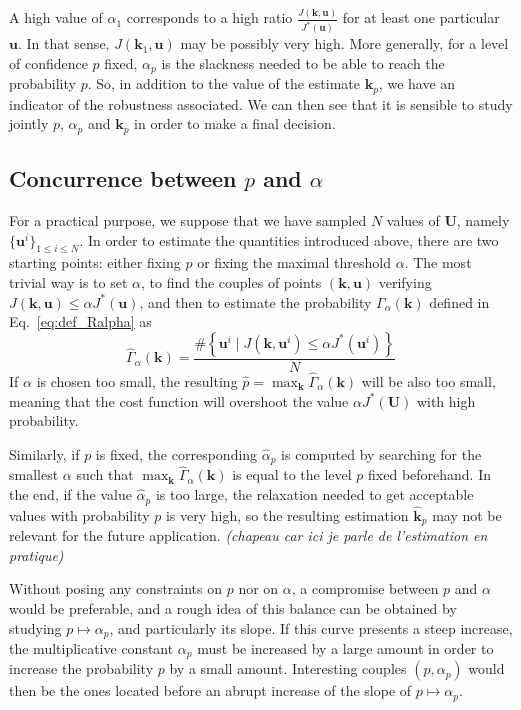 \documentclass[preprint, 1p]{elsarticle}
\newcommand{\checkap}{{\alpha}_p}
\newcommand{\checka}{{\alpha}}
\newcommand{\checkk}{\mathbf{k}}
\newcommand{\checkkp}{{\mathbf{k}}_p}
\newcommand{\victor}[1]{{\itshape\color{green} ({#1})}}
\begin{document}
A high value of $\checka_1$ corresponds to a high ratio $\frac{J(\mathbf{k},\mathbf{u})}{J^*(\mathbf{u})}$ for at least one particular $\mathbf{u}$. In that sense, $J(\checkk_1,\mathbf{u})$ may be possibly very high.
More generally, for a level of confidence $p$ fixed, $\checkap$ is the slackness needed to be able to reach the probability $p$. So, in addition to the value of the estimate $\checkkp$, we have an indicator of the robustness associated. We can then see that it is sensible to study jointly $p$, $\checkap$ and $\checkkp$ in order to make a final decision.


\subsection{Concurrence between $p$ and $\alpha$}%
\label{ssec:balance}
For a practical purpose, we suppose that we have sampled $N$ values of $\mathbf{U}$, namely $\{\mathbf{u}^i\}_{1\leq i \leq N}$.
In order to estimate the quantities introduced above, there are two starting points: either fixing $p$ or fixing the maximal threshold $\alpha$. 
The most trivial way is to set $\alpha$, to find the couples of points $(\mathbf{k},\mathbf{u})$ verifying $J(\mathbf{k},\mathbf{u}) \leq \alpha J^*(\mathbf{u})$, and then to estimate the probability $\Gamma_{\alpha}(\mathbf{k})$ defined in Eq.~\eqref{eq:def_Ralpha} as 
\begin{equation}
\hat{\Gamma}_{\alpha}(\mathbf{k}) = \frac{\# \left\{\mathbf{u}^i \mid J(\mathbf{k},\mathbf{u}^i) \leq \alpha J^*(\mathbf{u}^i)\right\}}{N}
\end{equation}
If $\alpha$ is chosen too small, the resulting $\hat{p}=\max_{\mathbf{k}} \hat{\Gamma}_{\alpha}(\mathbf{k})$ will be also too small, meaning that the cost function will overshoot the value $\alpha J^*(\mathbf{U})$ with high probability.

Similarly, if $p$ is fixed, the corresponding $\hat{\checka}_p$ is computed by searching for the smallest $\alpha$ such that $\max_{\mathbf{k}} \hat{\Gamma}_{\alpha}(\mathbf{k})$ is equal to the level $p$ fixed beforehand. In the end, if the value $\hat{\checka}_p$ is too large, the relaxation needed to get acceptable values with probability $p$ is very high, so the resulting estimation $\hat{\checkk}_p$ may not be relevant for the future application.
\victor{chapeau car ici je parle de l'estimation en pratique}


Without posing any constraints on $p$ nor on $\alpha$, a compromise between $p$ and $\alpha$ would be preferable, and a rough idea of this balance can be obtained by studying $p \mapsto \checkap$, and particularly its slope.
If this curve presents a steep increase, the multiplicative constant $\checkap$ must be increased by a large amount in order to increase the probability $p$ by a small amount. Interesting couples $(p,\checkap)$ would then be the ones located before an abrupt increase of the slope of $p \mapsto \checkap$.
\end{document}
